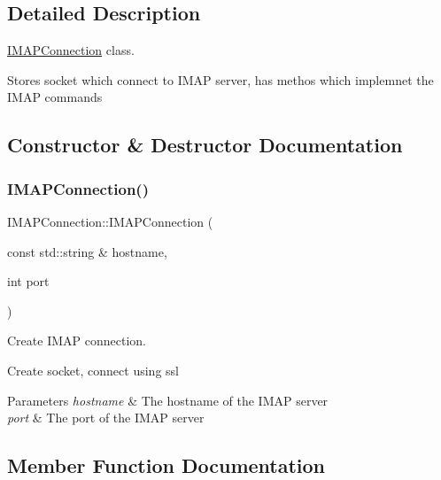 \subsection{Detailed Description}
\hyperlink{classIMAPConnection}{I\+M\+A\+P\+Connection} class. 

Stores socket which connect to I\+M\+AP server, has methos which implemnet the I\+M\+AP commands 

\subsection{Constructor \& Destructor Documentation}
\mbox{\label{classIMAPConnection_ad5bc450af38cf05e3c1747a3557939f8}} 
\subsubsection{\texorpdfstring{I\+M\+A\+P\+Connection()}{IMAPConnection()}}
{\footnotesize\ttfamily I\+M\+A\+P\+Connection\+::\+I\+M\+A\+P\+Connection (\begin{DoxyParamCaption}\item[{const std\+::string \&}]{hostname,  }\item[{int}]{port }\end{DoxyParamCaption})}



Create I\+M\+AP connection. 

Create socket, connect using ssl


\begin{DoxyParams}{Parameters}
{\em hostname} & The hostname of the I\+M\+AP server \\
\hline
{\em port} & The port of the I\+M\+AP server \\
\hline
\end{DoxyParams}


\subsection{Member Function Documentation}
\mbox{\label{classIMAPConnection_a1029095092aa116c6afafdcafa2cb722}} 
